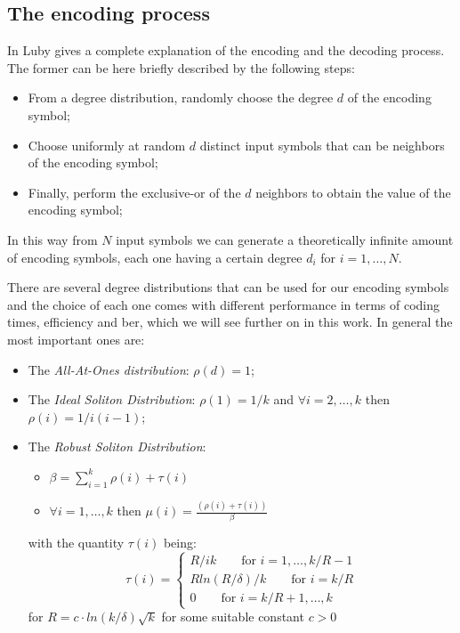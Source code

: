 \subsection{The encoding process}
In \cite{Luby} Luby gives a complete explanation of the encoding and the decoding process. The former can be here briefly described by the following steps:
\begin{itemize}
  \item From a degree distribution, randomly choose the degree $d$ of the encoding symbol;
  \item Choose uniformly at random $d$ distinct input symbols that can be neighbors of the encoding symbol;
  \item Finally, perform the exclusive-or of the $d$ neighbors to obtain the value of the encoding symbol;
\end{itemize}
In this way from $N$ input symbols we can generate a theoretically infinite amount of encoding symbols, each one having a certain degree $d_i$ for $i=1,\dots,N$.

There are several degree distributions that can be used for our encoding symbols and the choice of each one comes with different performance in terms of coding times, efficiency and \gls{ber}, which we will see further on in this work. In general the most important ones are:
\begin{itemize}
  \item The \textit{All-At-Ones distribution}: $\rho(d) = 1$;
  \item The \textit{Ideal Soliton Distribution}: $\rho(1) = 1/k$ and $\forall i = 2,\dots,k$ then $\rho(i) = 1/i(i-1)$;
  \item The \textit{Robust Soliton Distribution}:
  \begin{itemize}
    \item $\beta  = \sum_{i=1}^{k}\rho(i)+\tau(i)$
    \item $\forall i = 1,\dots,k$ then $\mu(i) = \frac{(\rho(i)+\tau(i))}{\beta}$
  \end{itemize}
  with the quantity $\tau(i)$ being:\\
  \[
  \tau(i) =
  \begin{cases}
    R/ik \qquad \text{for } i = 1,\dots,k/R-1\\
    Rln(R/\delta)/k \qquad \text{for } i = k/R\\
    0 \qquad \text{for } i = k/R +1, \dots,k
  \end{cases}
  \]
  for $R = c\cdot ln(k/\delta)\sqrt k$ for some suitable constant $c > 0$
\end{itemize}
